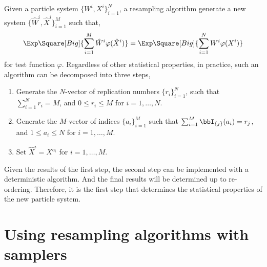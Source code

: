 Given a particle system $\{W^i,X^i\}_{i=1}^N$, a resampling algorithm
generate a new system $\{\hat{W}^i, \hat{X}^i\}_{i=1}^M$ such that,
\begin{equation*}
  \Exp\Square[Big]{\sum_{i=1}^M{\hat{W}^i\varphi(\hat{X}^i)}} =
  \Exp\Square[Big]{\sum_{i=1}^N{W^i\varphi(X^i)}}
\end{equation*}
for test function $\varphi$. Regardless of other statistical properties, in
practice, such an algorithm can be decomposed into three steps,
\begin{enumerate}
  \item Generate the $N$-vector of replication numbers $\{r_i\}_{i=1}^N$, such
    that $\sum_{i=1}^N r_i = M$, and $0 \le r_i \le M$ for $i=1,\dots,N$.
  \item Generate the $M$-vector of indices $\{a_i\}_{i=1}^M$ such that
    $\sum_{i=1}^M \bbI_{\{j\}}(a_i) = r_j$, and $1 \le a_i \le N$ for $i =
    1,\dots,M$.
  \item Set $\hat{X}^i = X^{a_i}$ for $i = 1,\dots,M$.
\end{enumerate}
Given the results of the first step, the second step can be implemented with a
deterministic algorithm. And the final results will be determined up to
re-ordering. Therefore, it is the first step that determines the statistical
properties of the new particle system.

\section{Using resampling algorithms with samplers}
\label{sec:Using resampling algorithms with samplers}

